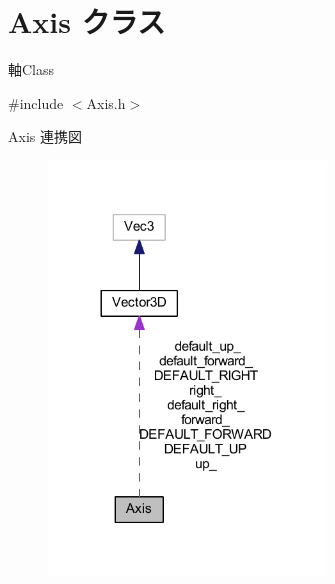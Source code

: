\hypertarget{class_axis}{}\section{Axis クラス}
\label{class_axis}


軸\+Class  




{\ttfamily \#include $<$Axis.\+h$>$}



Axis 連携図\nopagebreak
\begin{figure}[H]
\begin{center}
\leavevmode
\includegraphics[width=209pt]{class_axis__coll__graph}
\end{center}
\end{figure}

